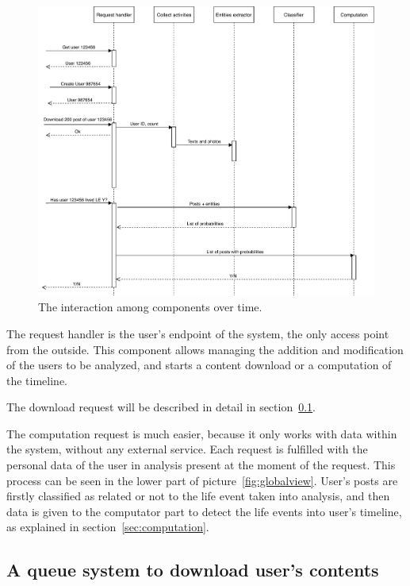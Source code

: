 \begin{figure}
\centering
\includegraphics[width=%
1\textwidth]{img/Interaction}
\caption{The interaction among components over time.}
\label{fig:interaction}
\end{figure}

The request handler is the user's endpoint of the system, the only access point from the outside. This component allows managing the addition and modification of the users to be analyzed, and starts a content download or a computation of the timeline.

The download request will be described in detail in section~\ref{sec:downloadqueues}.

The computation request is much easier, because it only works with data within the system, without any external service. Each request is fulfilled with the personal data of the user in analysis present at the moment of the request. This process can be seen in the lower part of picture~\ref{fig:globalview}. User's posts are firstly classified as related or not to the life event taken into analysis, and then data is given to the computator part to detect the life events into user's timeline, as explained in section~\ref{sec:computation}. 

\subsection{A queue system to download user's contents}
\label{sec:downloadqueues}

